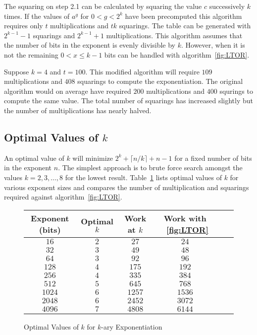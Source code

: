 \documentclass[b5paper]{book}
\begin{document}
The squaring on step 2.1 can be calculated by squaring the value $c$ successively $k$ times.  If the values of $a^g$ for $0 < g < 2^k$ have been
precomputed this algorithm requires only $t$ multiplications and $tk$ squarings.  The table can be generated with $2^{k - 1} - 1$ squarings and
$2^{k - 1} + 1$ multiplications.  This algorithm assumes that the number of bits in the exponent is evenly divisible by $k$.  
However, when it is not the remaining $0 < x \le k - 1$ bits can be handled with algorithm~\ref{fig:LTOR}.

Suppose $k = 4$ and $t = 100$.  This modified algorithm will require $109$ multiplications and $408$ squarings to compute the exponentiation.  The
original algorithm would on average have required $200$ multiplications and $400$ squrings to compute the same value.  The total number of squarings
has increased slightly but the number of multiplications has nearly halved.

\subsection{Optimal Values of $k$}
An optimal value of $k$ will minimize $2^{k} + \lceil n / k \rceil + n - 1$ for a fixed number of bits in the exponent $n$.  The simplest
approach is to brute force search amongst the values $k = 2, 3, \ldots, 8$ for the lowest result.  Table~\ref{fig:OPTK} lists optimal values of $k$
for various exponent sizes and compares the number of multiplication and squarings required against algorithm~\ref{fig:LTOR}.  

\begin{figure}[here]
\begin{center}
\begin{small}
\begin{tabular}{|c|c|c|c|c|c|}
\hline \textbf{Exponent (bits)} & \textbf{Optimal $k$} & \textbf{Work at $k$} & \textbf{Work with ~\ref{fig:LTOR}} \\
\hline $16$ & $2$ & $27$ & $24$ \\
\hline $32$ & $3$ & $49$ & $48$ \\
\hline $64$ & $3$ & $92$ & $96$ \\
\hline $128$ & $4$ & $175$ & $192$ \\
\hline $256$ & $4$ & $335$ & $384$ \\
\hline $512$ & $5$ & $645$ & $768$ \\
\hline $1024$ & $6$ & $1257$ & $1536$ \\
\hline $2048$ & $6$ & $2452$ & $3072$ \\
\hline $4096$ & $7$ & $4808$ & $6144$ \\
\hline
\end{tabular}
\end{small}
\end{center}
\caption{Optimal Values of $k$ for $k$-ary Exponentiation}
\label{fig:OPTK}
\end{figure}
\end{document}
